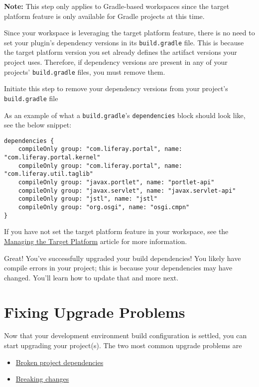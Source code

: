 \noindent\hrulefill

\textbf{Note:} This step only applies to Gradle-based workspaces since
the target platform feature is only available for Gradle projects at
this time.

\noindent\hrulefill

Since your workspace is leveraging the target platform feature, there is
no need to set your plugin's dependency versions in its
\texttt{build.gradle} file. This is because the target platform version
you set already defines the artifact versions your project uses.
Therefore, if dependency versions are present in any of your projects'
\texttt{build.gradle} files, you must remove them.

Initiate this step to remove your dependency versions from your
project's \texttt{build.gradle} file

As an example of what a \texttt{build.gradle}'s \texttt{dependencies}
block should look like, see the below snippet:

\begin{verbatim}
dependencies {
    compileOnly group: "com.liferay.portal", name: "com.liferay.portal.kernel"
    compileOnly group: "com.liferay.portal", name: "com.liferay.util.taglib"
    compileOnly group: "javax.portlet", name: "portlet-api"
    compileOnly group: "javax.servlet", name: "javax.servlet-api"
    compileOnly group: "jstl", name: "jstl"
    compileOnly group: "org.osgi", name: "osgi.cmpn"
}
\end{verbatim}

If you have not set the target platform feature in your workspace, see
the
\href{/docs/7-2/reference/-/knowledge_base/r/managing-the-target-platform}{Managing
the Target Platform} article for more information.

Great! You've successfully upgraded your build dependencies! You likely
have compile errors in your project; this is because your dependencies
may have changed. You'll learn how to update that and more next.

\chapter{Fixing Upgrade Problems}\label{fixing-upgrade-problems}

Now that your development environment build configuration is settled,
you can start upgrading your project(s). The two most common upgrade
problems are

\begin{itemize}
\tightlist
\item
  \href{/docs/7-2/tutorials/-/knowledge_base/t/resolving-a-projects-dependencies}{Broken
  project dependencies}
\item
  \href{/docs/7-2/tutorials/-/knowledge_base/t/resolving-breaking-changes}{Breaking
  changes}
\end{itemize}

